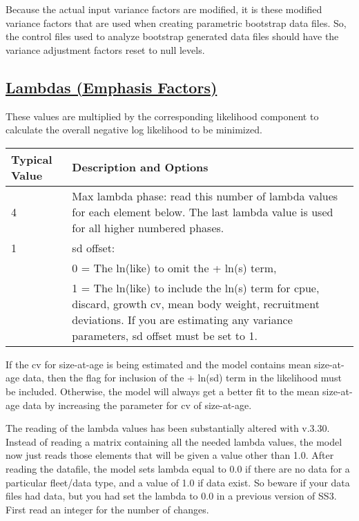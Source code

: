 Because the actual input variance factors are modified, it is these modified variance factors that are used when creating parametric bootstrap data files. So, the control files used to analyze bootstrap generated data files should have the variance adjustment factors reset to null levels.


\hypertarget{Lambdas}{}
\subsection[Lambdas (Emphasis Factors)]{\protect\hyperlink{Lambdas}{Lambdas (Emphasis Factors)}}
These values are multiplied by the corresponding likelihood component to calculate the overall negative log likelihood to be minimized.


\begin{tabular}{p{3cm} p{13cm}}
	\hline
	Typical Value & Description and Options \Tstrut\Bstrut\\
	\hline
	4 \Tstrut & Max lambda phase: read this number of lambda values for each element below. The last lambda value is used for all higher numbered phases. \Bstrut\\
	1 & \gls{sd} offset: \\
	  & 0 = The ln(like) to omit the + ln(s) term, \\
	  & 1 = The ln(like) to include the ln(s) term for \gls{cpue}, discard, growth \gls{cv}, mean body weight, recruitment deviations. If you are estimating any variance parameters, \gls{sd} offset must be set to 1. \Bstrut\\
	\hline
\end{tabular}

\hypertarget{SaAlambda}{}
If the \gls{cv} for size-at-age is being estimated and the model contains mean size-at-age data, then the flag for inclusion of the + ln(\gls{sd}) term in the likelihood must be included. Otherwise, the model will always get a better fit to the mean size-at-age data by increasing the parameter for \gls{cv} of size-at-age.

The reading of the lambda values has been substantially altered with v.3.30. Instead of reading a matrix containing all the needed lambda values, the model now just reads those elements that will be given a value other than 1.0. After reading the datafile, the model sets lambda equal to 0.0 if there are no data for a particular fleet/data type, and a value of 1.0 if data exist. So beware if your data files had data, but you had set the lambda to 0.0 in a previous version of SS3. First read an integer for the number of changes.

